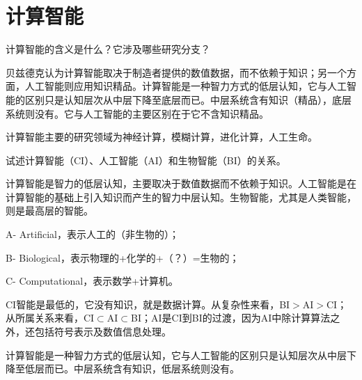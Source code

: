 \chapter{计算智能}

\begin{question}
计算智能的含义是什么？它涉及哪些研究分支？
\end{question}
\begin{solution}
贝兹德克认为计算智能取决于制造者提供的数值数据，而不依赖于知识；另一个方面，人工智能则应用知识精品。计算智能是一种智力方式的低层认知，它与人工智能的区别只是认知层次从中层下降至底层而已。中层系统含有知识（精品），底层系统则没有。它与人工智能的主要区别在于它不含知识精品。\par
计算智能主要的研究领域为神经计算，模糊计算，进化计算，人工生命。 
\end{solution}

\begin{question}
试述计算智能（CI）、人工智能（AI）和生物智能（BI）的关系。
\end{question}
\begin{solution}
计算智能是智力的低层认知，主要取决于数值数据而不依赖于知识。人工智能是在计算智能的基础上引入知识而产生的智力中层认知。生物智能，尤其是人类智能，则是最高层的智能。\par
A- Artificial，表示人工的（非生物的）；\par
B- Biological，表示物理的+化学的+（？）=生物的；\par
C- Computational，表示数学+计算机。\par
CI智能是最低的，它没有知识，就是数据计算。从复杂性来看，BI$>$AI$>$CI；从所属关系来看，CI$\subset$AI$\subset$BI；AI是CI到BI的过渡，因为AI中除计算算法之外，还包括符号表示及数值信息处理。\par
计算智能是一种智力方式的低层认知，它与人工智能的区别只是认知层次从中层下降至低层而已。中层系统含有知识，低层系统则没有。
\end{solution}

